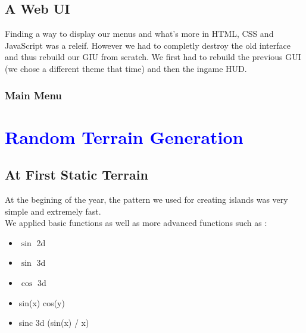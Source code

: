 \documentclass[article]{report}         %
\begin{document}
      \section{A Web UI}
        Finding a way to display our menus and what's more in HTML, CSS and JavaScript was a releif. However we had to completly destroy the old interface and thus rebuild our GIU from scratch. We first had to rebuild the previous GUI (we chose a different theme that time) and then the ingame HUD.

        \subsection{Main Menu}


    \chapter{\textcolor{blue}{Random Terrain Generation}}
      \section{At First Static Terrain}
        At the begining of the year, the pattern we used for creating islands was very simple and extremely fast.\\
        We applied basic functions as well as more advanced functions such as :

        \begin{itemize}
          
          \item $\sin$ 2d
          \item $\sin$ 3d
          \item $\cos$ 3d
          \item sin(x) cos(y)
          \item sinc 3d (sin(x) / x)
        \end{itemize}
\end{document}
